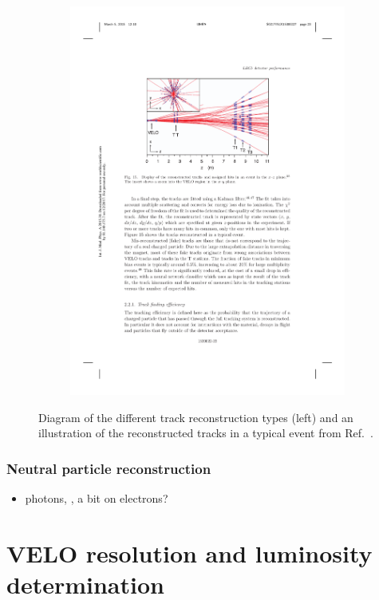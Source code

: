 \begin{figure}[!h]
\begin{subfigure}[t]{0.4\textwidth}
        \includegraphics[width=1.0\textwidth]{figs/Detector/reco_track_reco.pdf}
    \end{subfigure}
    \caption{Diagram of the different track reconstruction types (left) and an illustration of the reconstructed tracks in a typical event from Ref.~\cite{LHCb-DP-2014-002}.}
    \label{fig:Dec_reco_tracks}   
\end{figure}

\subsubsection{Neutral particle reconstruction}


{\color{Red}
\begin{itemize}
\item photons, \piz, a bit on electrons?
\end{itemize}
}

\section{VELO resolution and luminosity determination}